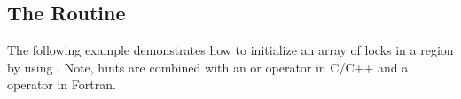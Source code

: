 \subsection{The  Routine}
\label{subsec:init_lock_with_hint}

The following example demonstrates how to initialize an array of locks in a  region by using .
Note, hints are combined with an \code{|} or \code{+} operator in C/C++ and a \code{+} operator in Fortran.


